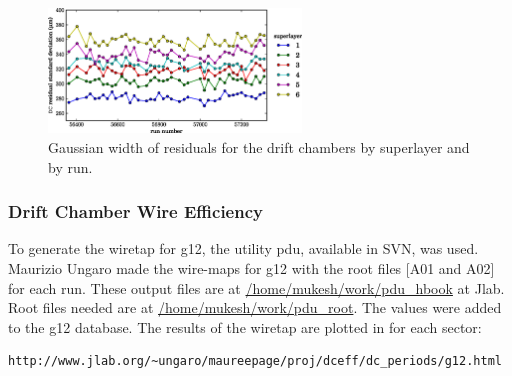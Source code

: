 \begin{figure}\begin{center}
\includegraphics[width=0.6\textwidth]{figures/calib/dc/dc_resid_sigma.eps}
\caption[DC Residuals (Width)]{\label{fig:calib.dc.residuals.wid}Gaussian width of residuals for the drift chambers by superlayer and by run.}
\end{center}\end{figure}

\subsubsection{\label{sec:calib.dc.eff}Drift Chamber Wire Efficiency}
To generate the wiretap for g12, the utility pdu, available in SVN, was used. Maurizio Ungaro made the wire-maps for g12 with the root files [A01 and A02] for each run. These output files are at \url{/home/mukesh/work/pdu_hbook} at Jlab. Root files needed are at \url{/home/mukesh/work/pdu_root}. The values were added to the g12 database. The results of the wiretap are plotted in for each sector:

\begin{verbatim}
http://www.jlab.org/~ungaro/maureepage/proj/dceff/dc_periods/g12.html
\end{verbatim}

\FloatBarrier
